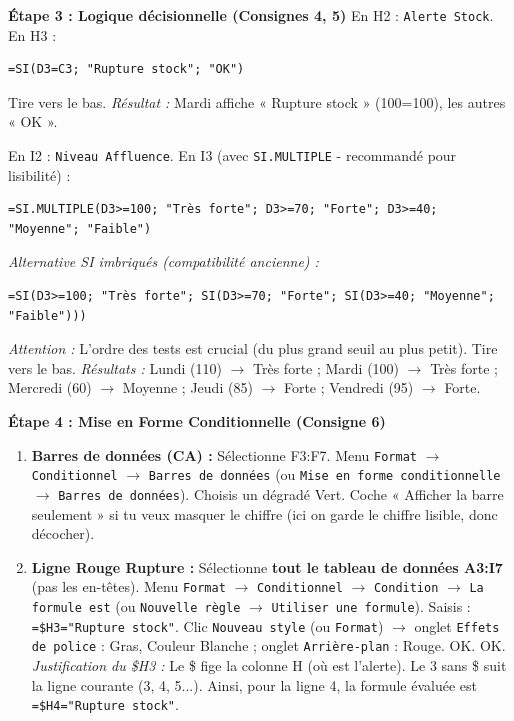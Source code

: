 \documentclass[11pt]{article}
\begin{document}
\begin{exoresolu}
\textbf{Étape 3 : Logique décisionnelle (Consignes 4, 5)}
En H2 : \texttt{Alerte Stock}. En H3 :
\begin{lstlisting}
=SI(D3=C3; "Rupture stock"; "OK")
\end{lstlisting}
Tire vers le bas. \emph{Résultat :} Mardi affiche « Rupture stock » (100=100), les autres « OK ».

En I2 : \texttt{Niveau Affluence}. En I3 (avec \texttt{SI.MULTIPLE} - recommandé pour lisibilité) :
\begin{lstlisting}
=SI.MULTIPLE(D3>=100; "Très forte"; D3>=70; "Forte"; D3>=40; "Moyenne"; "Faible")
\end{lstlisting}
\emph{Alternative SI imbriqués (compatibilité ancienne) :}
\begin{lstlisting}
=SI(D3>=100; "Très forte"; SI(D3>=70; "Forte"; SI(D3>=40; "Moyenne"; "Faible")))
\end{lstlisting}
\emph{Attention :} L'ordre des tests est crucial (du plus grand seuil au plus petit). Tire vers le bas.
\emph{Résultats :} Lundi (110) $\rightarrow$ Très forte ; Mardi (100) $\rightarrow$ Très forte ; Mercredi (60) $\rightarrow$ Moyenne ; Jeudi (85) $\rightarrow$ Forte ; Vendredi (95) $\rightarrow$ Forte.

\textbf{Étape 4 : Mise en Forme Conditionnelle (Consigne 6)}
\begin{enumerate}
    \item \textbf{Barres de données (CA) :} Sélectionne F3:F7. Menu \texttt{Format} $\rightarrow$ \texttt{Conditionnel} $\rightarrow$ \texttt{Barres de données} (ou \texttt{Mise en forme conditionnelle} $\rightarrow$ \texttt{Barres de données}). Choisis un dégradé Vert. Coche « Afficher la barre seulement » si tu veux masquer le chiffre (ici on garde le chiffre lisible, donc décocher).
    \item \textbf{Ligne Rouge Rupture :} Sélectionne \textbf{tout le tableau de données A3:I7} (pas les en-têtes). Menu \texttt{Format} $\rightarrow$ \texttt{Conditionnel} $\rightarrow$ \texttt{Condition} $\rightarrow$ \texttt{La formule est} (ou \texttt{Nouvelle règle} $\rightarrow$ \texttt{Utiliser une formule}). Saisis : \texttt{=\$H3="Rupture stock"}. Clic \texttt{Nouveau style} (ou \texttt{Format}) $\rightarrow$ onglet \texttt{Effets de police} : Gras, Couleur Blanche ; onglet \texttt{Arrière-plan} : Rouge. OK. OK.
    \emph{Justification du \$H3 :} Le \$ fige la colonne H (où est l'alerte). Le 3 sans \$ suit la ligne courante (3, 4, 5...). Ainsi, pour la ligne 4, la formule évaluée est \texttt{=\$H4="Rupture stock"}.
\end{enumerate}


\end{exoresolu}
\end{document}
